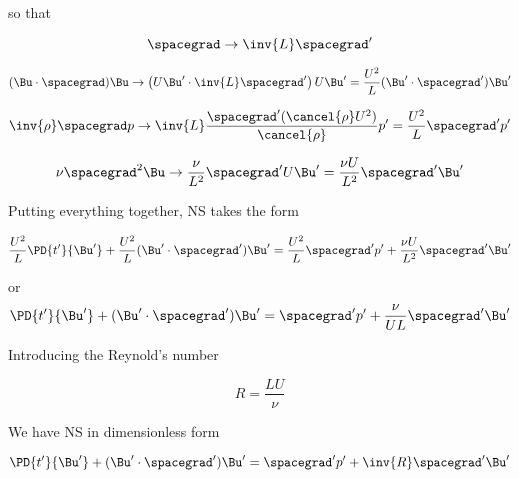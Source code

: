 so that 

\begin{equation}\label{eqn:continuumL14:370}
\spacegrad \rightarrow \inv{L} \spacegrad'
\end{equation}

\begin{equation}\label{eqn:continuumL14:390}
(\Bu \cdot \spacegrad ) \Bu \rightarrow 
\left( U \Bu' \cdot \inv{L} \spacegrad' \right) U \Bu' = \frac{U^2}{L} (\Bu' \cdot \spacegrad') \Bu'
\end{equation}

\begin{equation}\label{eqn:continuumL14:410}
\inv{\rho} \spacegrad p \rightarrow \inv{L} \frac{\spacegrad' (\cancel{\rho} U^2) }{\cancel{\rho}} p' = \frac{U^2}{L} \spacegrad' p'
\end{equation}

\begin{equation}\label{eqn:continuumL14:430}
\nu \spacegrad^2 \Bu \rightarrow \frac{\nu}{L^2} \spacegrad' U \Bu' = \frac{\nu U}{L^2} \spacegrad' \Bu'
\end{equation}

Putting everything together, NS takes the form

\begin{equation}\label{eqn:continuumL14:450}
\frac{U^2}{L} \PD{t'}{\Bu'} + \frac{U^2}{L} (\Bu' \cdot \spacegrad') \Bu' = \frac{U^2}{L} \spacegrad' p' + \frac{\nu U}{L^2} \spacegrad' \Bu'
\end{equation}

or
\begin{equation}\label{eqn:continuumL14:470}
\PD{t'}{\Bu'} + (\Bu' \cdot \spacegrad') \Bu' = \spacegrad' p' + \frac{\nu}{U L} \spacegrad' \Bu'
\end{equation}

Introducing the Reynold's number

\begin{equation}\label{eqn:continuumL14:490}
R = \frac{L U}{\nu}
\end{equation}

We have NS in dimensionless form

\begin{equation}\label{eqn:continuumL14:510}
\PD{t'}{\Bu'} + (\Bu' \cdot \spacegrad') \Bu' = \spacegrad' p' + \inv{R} \spacegrad' \Bu'
\end{equation}


\EndNoBibArticle
